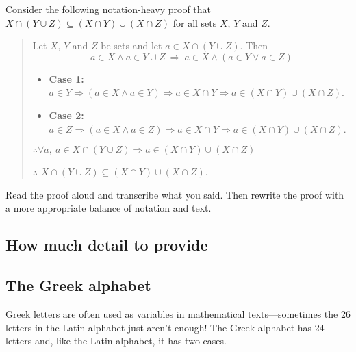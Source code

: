 \begin{exercise}
Consider the following notation-heavy proof that $X \cap (Y \cup Z) \subseteq (X \cap Y) \cup (X \cap Z)$ for all sets $X$, $Y$ and $Z$.
\begin{quote}
Let $X$, $Y$ and $Z$ be sets and let $a \in X \cap (Y \cup Z)$. Then
\[ a \in X \wedge a \in Y \cup Z ~ \Rightarrow ~ a \in X \wedge (a \in Y \vee a \in Z) \]
\begin{itemize}
\item \textbf{Case 1:} $a \in Y \Rightarrow (a \in X \wedge a \in Y) \Rightarrow a \in X \cap Y \Rightarrow a \in (X \cap Y) \cup (X \cap Z)$.
\item \textbf{Case 2:} $a \in Z \Rightarrow (a \in X \wedge a \in Z) \Rightarrow a \in X \cap Y \Rightarrow a \in (X \cap Y) \cup (X \cap Z)$.
\end{itemize}
$\therefore \forall a,~ a \in X \cap (Y \cup Z) \Rightarrow a \in (X \cap Y) \cup (X \cap Z)$

$\therefore$ $X \cap (Y \cup Z) \subseteq (X \cap Y) \cup (X \cap Z)$.
\end{quote}
Read the proof aloud and transcribe what you said. Then rewrite the proof with a more appropriate balance of notation and text.
\end{exercise}

\subsection*{How much detail to provide}



\subsection*{The Greek alphabet}

Greek letters are often used as variables in mathematical texts---sometimes the 26 letters in the Latin alphabet just aren't enough! The Greek alphabet has 24 letters and, like the Latin alphabet, it has two cases.


